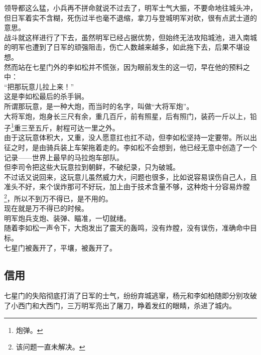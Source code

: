 \begin{multicols}{\theparacolNo}
领导都这么猛，小兵再不拼命就说不过去了，明军士气大振，不要命地往城头冲，但日军着实不含糊，死伤过半也毫不退缩，拿刀与登城明军对砍，很有点武士道的意思。\\

战斗就这样进行了下去，虽然明军已经占据优势，但始终无法攻陷城池，进入南城的明军也遭到了日军的顽强阻击，伤亡人数越来越多，如此拖下去，后果不堪设想。\\

然而站在七星门外的李如松并不慌张，因为眼前发生的这一切，早在他的预料之中：\\

“把那玩意儿拉上来！”\\

这是李如松最后的杀手锏。\\

所谓那玩意，是一种大炮，而当时的名字，叫做“大将军炮”。\\

大将军炮，炮身长三尺有余，重几百斤，前有照星，后有照门，装药一斤以上，铅子\footnote{炮弹。}重三至五斤，射程可达一里之外。\\

由于这玩意体积大，又重，没人愿意扛也扛不动，但李如松坚持一定要带。所以出征之时，是由骑兵装上车架拖着走的。李如松不会想到，他已经无意中创造了一个记录——世界上最早的马拉炮车部队。\\

但李司令把这些大玩意拉到朝鲜，不破纪录，只为破城。\\

不过话又说回来，这玩意儿虽然威力大，问题也很多，比如说容易误伤自己人，且准头不好，来个误炸那可不好玩，加上由于技术含量不够，这种炮十分容易炸膛\footnote{该问题一直未解决。}，所以不到万不得已，是不用的。\\

现在就是万不得已的时候。\\

明军炮兵支炮、装弹、瞄准，一切就绪。\\

随着李如松一声令下，大炮发出了震天的轰鸣，没有炸膛，没有误伤，准确命中目标。\\

七星门被轰开了，平壤，被轰开了。\\

\subsection{信用}
七星门的失陷彻底打消了日军的士气，纷纷弃城逃窜，杨元和李如柏随即分别攻破了小西门和大西门，三万明军亮出了屠刀，睁着发红的眼睛，杀进了城内。\\


\end{multicols}

